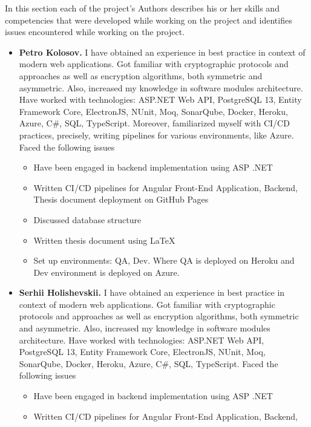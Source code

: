 In this section each of the project's Authors describes his or her skills and competencies that
were developed while working on the project and identifies issues encountered while working on the project.

\begin{itemize}
    \item \textbf{Petro Kolosov.} I have obtained an experience in best practice
    in context of modern web applications.
    Got familiar with cryptographic protocols and approaches as well as encryption algorithms,
    both symmetric and asymmetric.
    Also, increased my knowledge in software modules architecture.
    Have worked with technologies: ASP.NET Web API, PostgreSQL 13, Entity Framework Core, ElectronJS,
    NUnit, Moq, SonarQube, Docker, Heroku, Azure, C\#, SQL, TypeScript.
    Moreover, familiarized myself with CI/CD practices, precisely, writing pipelines for various environments,
    like Azure.
    Faced the following issues
    \begin{itemize}
        \item Have been engaged in backend implementation using ASP .NET
        \item Written CI/CD pipelines for Angular Front-End Application, Backend,
        Thesis document deployment on GitHub Pages
        \item Discussed database structure
        \item Written thesis document using \LaTeX
        \item Set up environments: QA, Dev.
        Where QA is deployed on Heroku and Dev environment is deployed on Azure.
    \end{itemize}
    \item \textbf{Serhii Holishevskii.} I have obtained an experience in best practice
    in context of modern web applications.
    Got familiar with cryptographic protocols and approaches as well as encryption algorithms,
    both symmetric and asymmetric.
    Also, increased my knowledge in software modules architecture.
    Have worked with technologies: ASP.NET Web API, PostgreSQL 13, Entity Framework Core, ElectronJS,
    NUnit, Moq, SonarQube, Docker, Heroku, Azure, C\#, SQL, TypeScript.
    Faced the following issues
    \begin{itemize}
        \item Have been engaged in backend implementation using ASP .NET
        \item Written CI/CD pipelines for Angular Front-End Application, Backend,

\end{itemize}
\end{itemize}

